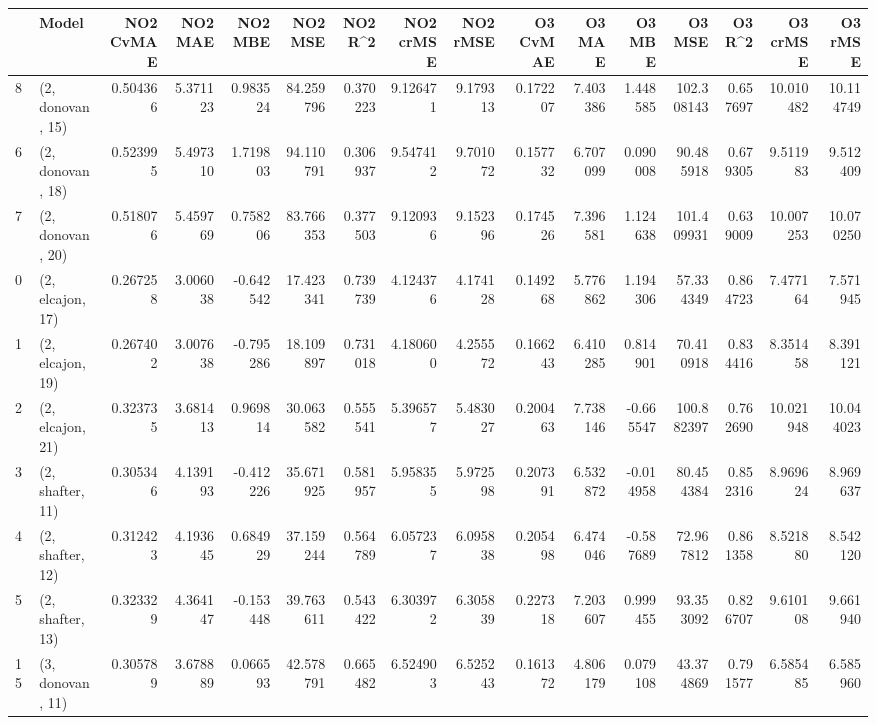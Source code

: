 \begin{tabular}{llrrrrrrrrrrrrrr}
\toprule
{} &             Model &  NO2 CvMAE &   NO2 MAE &   NO2 MBE &    NO2 MSE &   NO2 R\textasciicircum2 &  NO2 crMSE &  NO2 rMSE &  O3 CvMAE &    O3 MAE &    O3 MBE &      O3 MSE &    O3 R\textasciicircum2 &   O3 crMSE &    O3 rMSE \\
\midrule
8  &  (2, donovan, 15) &   0.504366 &  5.371123 &  0.983524 &  84.259796 &  0.370223 &   9.126471 &  9.179313 &  0.172207 &  7.403386 &  1.448585 &  102.308143 &  0.657697 &  10.010482 &  10.114749 \\
6  &  (2, donovan, 18) &   0.523995 &  5.497310 &  1.719803 &  94.110791 &  0.306937 &   9.547412 &  9.701072 &  0.157732 &  6.707099 &  0.090008 &   90.485918 &  0.679305 &   9.511983 &   9.512409 \\
7  &  (2, donovan, 20) &   0.518076 &  5.459769 &  0.758206 &  83.766353 &  0.377503 &   9.120936 &  9.152396 &  0.174526 &  7.396581 &  1.124638 &  101.409931 &  0.639009 &  10.007253 &  10.070250 \\
0  &  (2, elcajon, 17) &   0.267258 &  3.006038 & -0.642542 &  17.423341 &  0.739739 &   4.124376 &  4.174128 &  0.149268 &  5.776862 &  1.194306 &   57.334349 &  0.864723 &   7.477164 &   7.571945 \\
1  &  (2, elcajon, 19) &   0.267402 &  3.007638 & -0.795286 &  18.109897 &  0.731018 &   4.180600 &  4.255572 &  0.166243 &  6.410285 &  0.814901 &   70.410918 &  0.834416 &   8.351458 &   8.391121 \\
2  &  (2, elcajon, 21) &   0.323735 &  3.681413 &  0.969814 &  30.063582 &  0.555541 &   5.396577 &  5.483027 &  0.200463 &  7.738146 & -0.665547 &  100.882397 &  0.762690 &  10.021948 &  10.044023 \\
3  &  (2, shafter, 11) &   0.305346 &  4.139193 & -0.412226 &  35.671925 &  0.581957 &   5.958355 &  5.972598 &  0.207391 &  6.532872 & -0.014958 &   80.454384 &  0.852316 &   8.969624 &   8.969637 \\
4  &  (2, shafter, 12) &   0.312423 &  4.193645 &  0.684929 &  37.159244 &  0.564789 &   6.057237 &  6.095838 &  0.205498 &  6.474046 & -0.587689 &   72.967812 &  0.861358 &   8.521880 &   8.542120 \\
5  &  (2, shafter, 13) &   0.323329 &  4.364147 & -0.153448 &  39.763611 &  0.543422 &   6.303972 &  6.305839 &  0.227318 &  7.203607 &  0.999455 &   93.353092 &  0.826707 &   9.610108 &   9.661940 \\
15 &  (3, donovan, 11) &   0.305789 &  3.678889 &  0.066593 &  42.578791 &  0.665482 &   6.524903 &  6.525243 &  0.161372 &  4.806179 &  0.079108 &   43.374869 &  0.791577 &   6.585485 &   6.585960 \\

\end{tabular}
